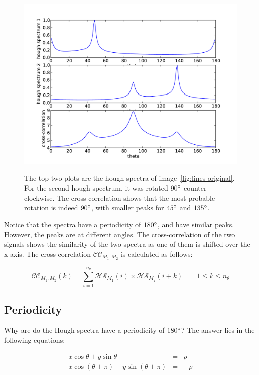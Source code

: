 \begin{figure}[ht]
	\centering
	\includegraphics[width=\textwidth]{images/stitching/lines-cross-correlation.pdf}
	\label{fig:lines-cross-correlation}
	\caption{The top two plots are the hough spectra of image~\ref{fig:lines-original}. For the second hough spectrum, it was rotated $90\degree$ counter-clockwise. The cross-correlation shows that the most probable rotation is indeed $90\degree$, with smaller peaks for $45\degree$ and $135\degree$.}
\end{figure}

Notice that the spectra have a periodicity of $180\degree$, and have similar peaks. However, the peaks are at different angles. The cross-correlation of the two signals shows the similarity of the two spectra as one of them is shifted over the x-axis. The cross-correlation $\mathcal{CC}_{M_1,M_2}$ is calculated as follows:

\begin{equation}
\mathcal{CC}_{M_1,M_2}(k) = \sum_{i=1}^{n_\theta} \mathcal{HS}_{M_1}(i) \times \mathcal{HS}_{M_2}(i + k) \qquad 1 \leq k \leq n_\theta
\end{equation}

\subsection{Periodicity}
\label{sub:periodicity}
Why are do the Hough spectra have a periodicity of $180\degree$? The answer lies in the following equations:

\begin{eqnarray}
x\cos \theta + y\sin \theta &=& \rho \\
x\cos(\theta + \pi) + y\sin (\theta + \pi) &=& -\rho
\end{eqnarray}

